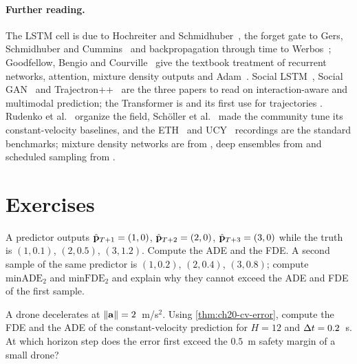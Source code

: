\paragraph{Further reading.}
The LSTM cell is due to Hochreiter and Schmidhuber~\cite{hochreiter1997lstm},
the forget gate to Gers, Schmidhuber and Cummins~\cite{gers2000learning} and
backpropagation through time to Werbos~\cite{werbos1990bptt}; Goodfellow,
Bengio and Courville~\cite{goodfellow2016deep} give the textbook treatment of
recurrent networks, attention, mixture density outputs and
Adam~\cite{kingma2015adam}. Social LSTM~\cite{alahi2016social}, Social
GAN~\cite{gupta2018social} and Trajectron++~\cite{salzmann2020trajectron} are
the three papers to read on interaction-aware and multimodal prediction; the
Transformer is \textcite{vaswani2017attention} and its first use for
trajectories \textcite{giuliari2021transformer}. Rudenko et
al.~\cite{rudenko2020human} organize the field, Sch{\"o}ller et
al.~\cite{schoeller2020constant} made the community tune its
constant-velocity baselines, and the ETH~\cite{pellegrini2009you} and
UCY~\cite{lerner2007crowds} recordings are the standard benchmarks; mixture
density networks are from \textcite{bishop1994mixture}, deep ensembles from
\textcite{lakshminarayanan2017ensembles} and scheduled sampling from
\textcite{bengio2015scheduled}.

\section{Exercises}
\label{sec:ch20-exercises}

\begin{exercise}[\difficulty{1}]
\label{exr:ch20-metrics-hand}
A predictor outputs $\hat{\mathbf{p}}_{T+1} = (1, 0)$, $\hat{\mathbf{p}}_{T+2} = (2, 0)$,
$\hat{\mathbf{p}}_{T+3} = (3, 0)$ while the truth is $(1, 0.1)$, $(2, 0.5)$,
$(3, 1.2)$. Compute the ADE and the FDE. A second sample of the same
predictor is $(1, 0.2)$, $(2, 0.4)$, $(3, 0.8)$; compute $\mathrm{minADE}_2$
and $\mathrm{minFDE}_2$ and explain why they cannot exceed the ADE and FDE of
the first sample.
\end{exercise}

\begin{exercise}[\difficulty{1}]
\label{exr:ch20-cv-accel}
A drone decelerates at $\left\lVert \mathbf{a} \right\rVert = 2$~m/s$^2$. Using
\cref{thm:ch20-cv-error}, compute the FDE and the ADE of the
constant-velocity prediction for $H = 12$ and $\Delta t = 0.2$~s. At which horizon
step does the error first exceed the $0.5$~m safety margin of a small drone?
\end{exercise}

